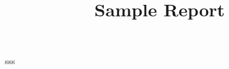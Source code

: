 \documentclass[report]{../../custom}
\title{Sample Report}
\begin{document}
\maketitle

sss
\end{document}
